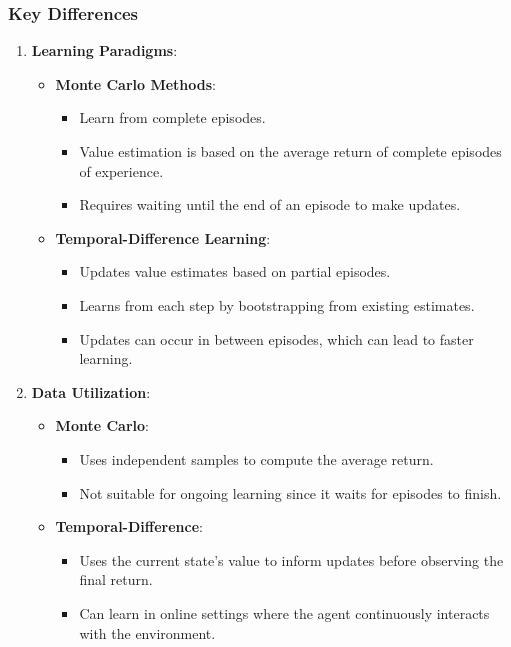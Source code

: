 \documentclass[aspectratio=169]{beamer}
\begin{document}
\begin{frame}[fragile]
  \frametitle{Key Differences}
  \begin{enumerate}
    \item \textbf{Learning Paradigms}:
      \begin{itemize}
        \item \textbf{Monte Carlo Methods}:
          \begin{itemize}
            \item Learn from complete episodes.
            \item Value estimation is based on the average return of complete episodes of experience.
            \item Requires waiting until the end of an episode to make updates.
          \end{itemize}
        \item \textbf{Temporal-Difference Learning}:
          \begin{itemize}
            \item Updates value estimates based on partial episodes.
            \item Learns from each step by bootstrapping from existing estimates.
            \item Updates can occur in between episodes, which can lead to faster learning.
          \end{itemize}
      \end{itemize}
    
    \item \textbf{Data Utilization}:
      \begin{itemize}
        \item \textbf{Monte Carlo}:
          \begin{itemize}
            \item Uses independent samples to compute the average return.
            \item Not suitable for ongoing learning since it waits for episodes to finish.
          \end{itemize}
        \item \textbf{Temporal-Difference}:
          \begin{itemize}
            \item Uses the current state's value to inform updates before observing the final return.
            \item Can learn in online settings where the agent continuously interacts with the environment.
          \end{itemize}
      \end{itemize}
  \end{enumerate}
\end{frame}
\end{document}
